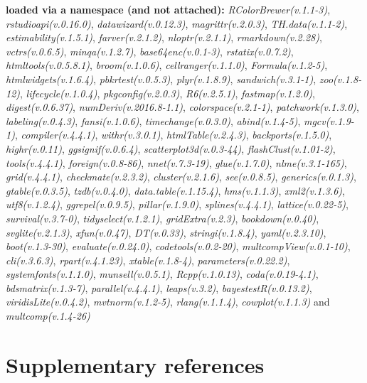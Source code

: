 \documentclass[
  bookmarksnumbered]{article}
\begin{document}
\textbf{loaded via a namespace (and not attached):}
\emph{RColorBrewer(v.1.1-3)}, \emph{rstudioapi(v.0.16.0)}, \emph{datawizard(v.0.12.3)}, \emph{magrittr(v.2.0.3)}, \emph{TH.data(v.1.1-2)}, \emph{estimability(v.1.5.1)}, \emph{farver(v.2.1.2)}, \emph{nloptr(v.2.1.1)}, \emph{rmarkdown(v.2.28)}, \emph{vctrs(v.0.6.5)}, \emph{minqa(v.1.2.7)}, \emph{base64enc(v.0.1-3)}, \emph{rstatix(v.0.7.2)}, \emph{htmltools(v.0.5.8.1)}, \emph{broom(v.1.0.6)}, \emph{cellranger(v.1.1.0)}, \emph{Formula(v.1.2-5)}, \emph{htmlwidgets(v.1.6.4)}, \emph{pbkrtest(v.0.5.3)}, \emph{plyr(v.1.8.9)}, \emph{sandwich(v.3.1-1)}, \emph{zoo(v.1.8-12)}, \emph{lifecycle(v.1.0.4)}, \emph{pkgconfig(v.2.0.3)}, \emph{R6(v.2.5.1)}, \emph{fastmap(v.1.2.0)}, \emph{digest(v.0.6.37)}, \emph{numDeriv(v.2016.8-1.1)}, \emph{colorspace(v.2.1-1)}, \emph{patchwork(v.1.3.0)}, \emph{labeling(v.0.4.3)}, \emph{fansi(v.1.0.6)}, \emph{timechange(v.0.3.0)}, \emph{abind(v.1.4-5)}, \emph{mgcv(v.1.9-1)}, \emph{compiler(v.4.4.1)}, \emph{withr(v.3.0.1)}, \emph{htmlTable(v.2.4.3)}, \emph{backports(v.1.5.0)}, \emph{highr(v.0.11)}, \emph{ggsignif(v.0.6.4)}, \emph{scatterplot3d(v.0.3-44)}, \emph{flashClust(v.1.01-2)}, \emph{tools(v.4.4.1)}, \emph{foreign(v.0.8-86)}, \emph{nnet(v.7.3-19)}, \emph{glue(v.1.7.0)}, \emph{nlme(v.3.1-165)}, \emph{grid(v.4.4.1)}, \emph{checkmate(v.2.3.2)}, \emph{cluster(v.2.1.6)}, \emph{see(v.0.8.5)}, \emph{generics(v.0.1.3)}, \emph{gtable(v.0.3.5)}, \emph{tzdb(v.0.4.0)}, \emph{data.table(v.1.15.4)}, \emph{hms(v.1.1.3)}, \emph{xml2(v.1.3.6)}, \emph{utf8(v.1.2.4)}, \emph{ggrepel(v.0.9.5)}, \emph{pillar(v.1.9.0)}, \emph{splines(v.4.4.1)}, \emph{lattice(v.0.22-5)}, \emph{survival(v.3.7-0)}, \emph{tidyselect(v.1.2.1)}, \emph{gridExtra(v.2.3)}, \emph{bookdown(v.0.40)}, \emph{svglite(v.2.1.3)}, \emph{xfun(v.0.47)}, \emph{DT(v.0.33)}, \emph{stringi(v.1.8.4)}, \emph{yaml(v.2.3.10)}, \emph{boot(v.1.3-30)}, \emph{evaluate(v.0.24.0)}, \emph{codetools(v.0.2-20)}, \emph{multcompView(v.0.1-10)}, \emph{cli(v.3.6.3)}, \emph{rpart(v.4.1.23)}, \emph{xtable(v.1.8-4)}, \emph{parameters(v.0.22.2)}, \emph{systemfonts(v.1.1.0)}, \emph{munsell(v.0.5.1)}, \emph{Rcpp(v.1.0.13)}, \emph{coda(v.0.19-4.1)}, \emph{bdsmatrix(v.1.3-7)}, \emph{parallel(v.4.4.1)}, \emph{leaps(v.3.2)}, \emph{bayestestR(v.0.13.2)}, \emph{viridisLite(v.0.4.2)}, \emph{mvtnorm(v.1.2-5)}, \emph{rlang(v.1.1.4)}, \emph{cowplot(v.1.1.3)} and \emph{multcomp(v.1.4-26)}

\section{Supplementary references}\label{refs}

\begin{multicols}{2}
\AtNextBibliography{\footnotesize}
\printbibliography[heading=none]
\normalsize
\end{multicols}

\def\printbibliography{}

\printbibliography
\end{document}
